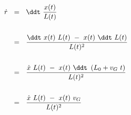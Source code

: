 
	\setcounter{tc}{0}

	~\\
	~\\

	$\begin{aligned}[t]
	\dot{r} ~~ &= ~~ \ddt ~ \frac{x(t)}{L(t)} \\ \\
	&= ~~ \frac{ \ddt ~ x(t) ~ L(t) ~ - ~ x(t) ~ \ddt ~ L(t) }{ L(t)^2 } \\ \\
	&= ~~ \frac{ \dot{x} ~ L(t) ~ - ~ x(t) ~ \ddt ~ \left( L_0 + v_G ~ t \right) }{ L(t)^2 } \\ \\
	&= ~~ \frac{ \dot{x} ~ L(t) ~ - ~ x(t) ~ v_G }{ L(t)^2 } \\ \\
	\end{aligned}$
	
